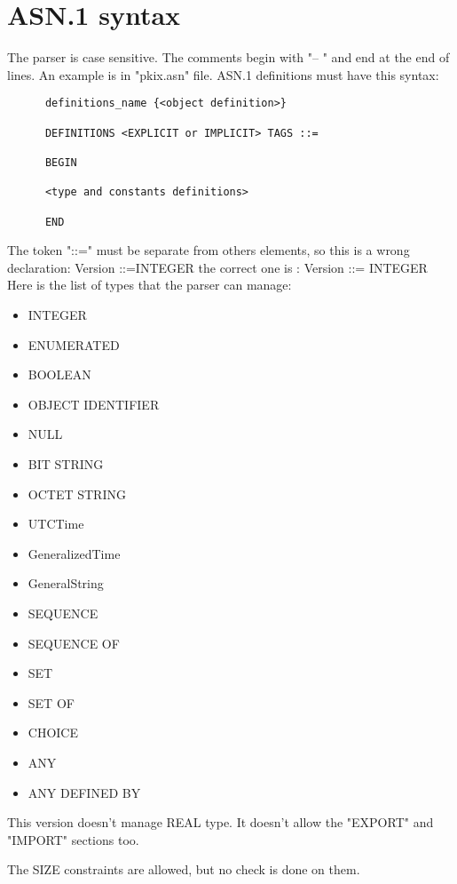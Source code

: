 \documentclass{book}
\begin{document}
\section{ASN.1 syntax}
The parser is case sensitive. The comments begin with "-- " and end at the end of lines.
An example is in "pkix.asn" file.
ASN.1 definitions must have this syntax:
      
\begin{verbatim}
      definitions_name {<object definition>}

      DEFINITIONS <EXPLICIT or IMPLICIT> TAGS ::=

      BEGIN 

      <type and constants definitions>

      END
\end{verbatim}

\par
The token "::=" must be separate from others elements, so this is a wrong declaration:
      Version ::=INTEGER 
the correct one is :   Version ::= INTEGER
Here is the list of types that the parser can manage:
\begin{itemize}

\item      INTEGER
\item      ENUMERATED
\item      BOOLEAN
\item      OBJECT IDENTIFIER
\item      NULL
\item      BIT STRING
\item      OCTET STRING
\item      UTCTime
\item      GeneralizedTime
\item      GeneralString
\item      SEQUENCE
\item      SEQUENCE OF
\item      SET 
\item      SET OF
\item      CHOICE
\item      ANY
\item      ANY DEFINED BY
\end{itemize}

This version doesn't manage REAL type. It doesn't allow the  
"EXPORT" and "IMPORT" sections too.

The SIZE constraints are allowed, but no check is done on them.
\end{document}
